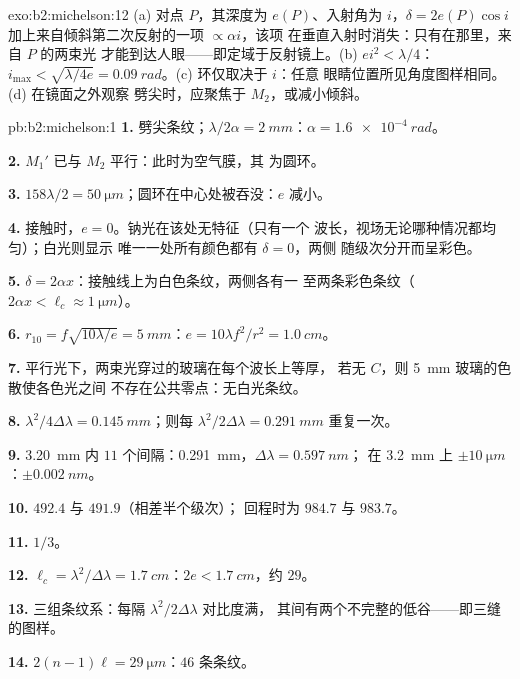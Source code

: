 \begin{solution}{exo:b2:michelson:12}
(a) 对点 $P$，其深度为 $e(P)$、入射角为 $i$，$\delta = 2e(P)\cos i$
加上来自倾斜第二次反射的一项 $\propto\alpha i$，该项
在垂直入射时消失：只有在那里，来自 $P$ 的两束光
才能到达人眼——即定域于反射镜上。(b) $ei^2 < \lambda/4$：$i_{\max} <
\sqrt{\lambda/4e} = \qty{0.09}{rad}$。(c) 环仅取决于 $i$：任意
眼睛位置所见角度图样相同。(d) 在镜面之外观察
劈尖时，应聚焦于 $M_2$，或减小倾斜。
\end{solution}

\begin{solution}{pb:b2:michelson:1}
\textbf{1.} 劈尖条纹；$\lambda/2\alpha = \qty{2}{mm}$：$\alpha = \qty{1.6e-4}{rad}$。

\textbf{2.} $M_1'$ 已与 $M_2$ 平行：此时为空气膜，其
为圆环。

\textbf{3.} $158\lambda/2 = \qty{50}{\micro m}$；圆环在中心处被吞没：$e$
减小。

\textbf{4.} 接触时，$e = 0$。钠光在该处无特征（只有一个
波长，视场无论哪种情况都均匀）；白光则显示
唯一一处所有颜色都有 $\delta = 0$，两侧
随级次分开而呈彩色。

\textbf{5.} $\delta = 2\alpha x$：接触线上为白色条纹，两侧各有一
至两条彩色条纹（$2\alpha x < \ell_c \approx \qty{1}{\micro m}$）。

\textbf{6.} $r_{10} = f\sqrt{10\lambda/e} = \qty{5}{mm}$：$e = 10\lambda f^2/r^2 = \qty{1.0}{cm}$。

\textbf{7.} 平行光下，两束光穿过的玻璃在每个波长上等厚，
若无 $C$，则 \qty{5}{mm} 玻璃的色散使各色光之间
不存在公共零点：无白光条纹。

\textbf{8.} $\lambda^2/4\Delta\lambda = \qty{0.145}{mm}$；则每 $\lambda^2/2\Delta\lambda = \qty{0.291}{mm}$ 重复一次。

\textbf{9.} \qty{3.20}{mm} 内 $11$ 个间隔：\qty{0.291}{mm}，$\Delta\lambda = \qty{0.597}{nm}$；
在 \qty{3.2}{mm} 上 $\pm\qty{10}{\micro m}$：$\pm\qty{0.002}{nm}$。

\textbf{10.} $492.4$ 与 $491.9$（相差半个级次）；
回程时为 $984.7$ 与 $983.7$。

\textbf{11.} $1/3$。

\textbf{12.} $\ell_c = \lambda^2/\Delta\lambda = \qty{1.7}{cm}$：$2e < \qty{1.7}{cm}$，约 $29$。

\textbf{13.} 三组条纹系：每隔 $\lambda^2/2\Delta\lambda$ 对比度满，
其间有两个不完整的低谷——即三缝的图样。

\textbf{14.} $2(n - 1)\ell = \qty{29}{\micro m}$：$46$ 条条纹。


\end{solution}
